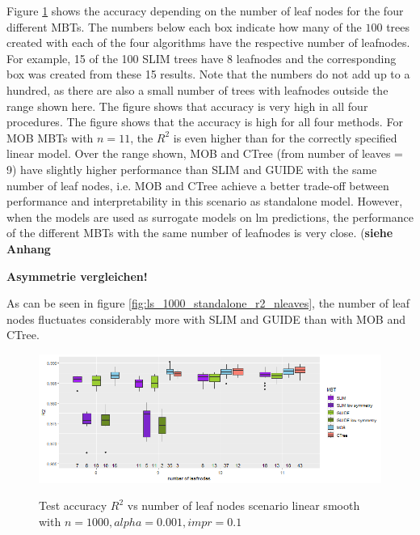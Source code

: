 Figure \ref{fig:ls_1000_standalone_r2_train} shows the accuracy depending on the number of leaf nodes for the four different MBTs.
The numbers below each box indicate how many of the $100$ trees created with each of the four algorithms have the respective number of leafnodes. For example, 15 of the 100 SLIM trees have 8 leafnodes and the corresponding box was created from these 15 results. Note that the numbers do not add up to a hundred, as there are also a small number of trees with leafnodes outside the range shown here. The figure shows that accuracy is very high in all four procedures. The figure shows that the accuracy is high for all four methods. For MOB MBTs with $n=11$, the $R^2$ is even higher than for the correctly specified linear model.  Over the range shown, MOB and CTree (from number of leaves = 9) have slightly higher performance than SLIM and GUIDE with the same number of leaf nodes, i.e. MOB and CTree achieve a better trade-off between performance and interpretability in this scenario as standalone model. However, when the models are used as surrogate models on lm predictions, the performance of the different MBTs with the same number of leafnodes is very close. (\textbf{siehe Anhang}

\textbf{Asymmetrie vergleichen!}

As can be seen in figure \ref{fig:ls_1000_standalone_r2_nleaves}, the number of leaf nodes fluctuates considerably more with SLIM and GUIDE than with MOB and CTree. 



\begin{figure} 
\caption{Test accuracy $R^2$ vs number of leaf nodes scenario linear smooth with $n=1000, alpha = 0.001, impr = 0.1$}
    \includegraphics[width=16cm]{Figures/simulations/batchtools/basic_scenarios/linear_smooth/ls_1000_standalone_r2_test.png}
    \label{fig:ls_1000_standalone_r2_train}
\end{figure} 





